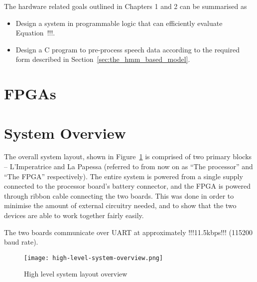 	The hardware related goals outlined in Chapters 1 and 2 can be summarised as
	\begin{itemize}
		\item Design a system in programmable logic that can efficiently evaluate Equation~!!!.
		\item Design a C program to pre-process speech data according to the required form described in Section~\ref{sec:the_hmm_based_model}.
	\end{itemize}


\section{FPGAs} %
\label{sec:fpgas}



\section{System Overview} %
\label{sec:system_overview}
	The overall system layout, shown in Figure~\ref{fig:hlsystem} is comprised of two primary blocks -- L'Imperatrice and La Papessa (referred to from now on as ``The processor'' and ``The FPGA'' respectively). The entire system is powered from a single supply connected to the processor board's battery connector, and the FPGA is powered through ribbon cable connecting the two boards.  This was done in order to minimise the amount of external circuitry needed, and to show that the two devices are able to work together fairly easily.

	The two boards communicate over UART at approximately !!!11.5kbps!!! (115200 baud rate).



	\begin{figure}[tb]
		\begin{center}
			\texttt{[image: high-level-system-overview.png]}
		\end{center}
		\caption{High level system layout overview}
		\label{fig:hlsystem}
	\end{figure}


